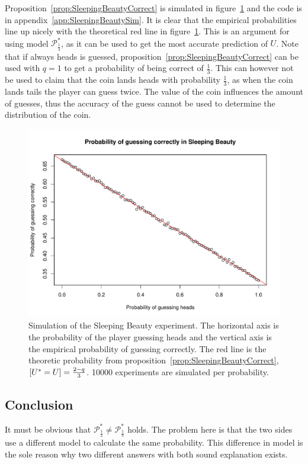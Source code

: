 \documentclass[twoside,a4paper]{article}
\theoremstyle{plain}
\theoremstyle{definition}
\theoremstyle{remark}
\numberwithin{equation}{section}
\let\P\relax
\DeclareMathOperator{\P}{\mathbb{P}}
\DeclareMathOperator{\1}{\mathbbm{1}}
\newcommand{\Pmod}{\mathcal{P}^*}
\begin{document}
Proposition~\ref{prop:SleepingBeautyCorrect} is simulated in figure~\ref{fig:SleepingBeautySim} and the code is in appendix~\ref{app:SleepingBeautySim}. It is clear that the empirical probabilities line up nicely with the theoretical red line in figure~\ref{fig:SleepingBeautySim}. This is an argument for using model $\Pmod_{\frac{1}{3}}$, as it can be used to get the most accurate prediction of $U$. Note that if always heads is guessed, proposition~\ref{prop:SleepingBeautyCorrect} can be used with $q=1$ to get a probability of being correct of $\frac{1}{3}$. This can however not be used to claim that the coin lands heads with probability $\frac{1}{3}$, as when the coin lands tails the player can guess twice. The value of the coin influences the amount of guesses, thus the accuracy of the guess cannot be used to determine the distribution of the coin.

\begin{figure}
\includegraphics[width=\linewidth]{Figures/SleepingBeauty.pdf}
\caption{Simulation of the Sleeping Beauty experiment. The horizontal axis is the probability of the player guessing heads and the vertical axis is the empirical probability of guessing correctly. The red line is the theoretic probability from proposition~\ref{prop:SleepingBeautyCorrect}, $\P[U^*=U]=\frac{2-q}{3}$. 10000 experiments are simulated per probability.}
\label{fig:SleepingBeautySim}
\end{figure}

\subsection{Conclusion}
It must be obvious that $\Pmod_{\frac{1}{2}}\neq\Pmod_{\frac{1}{3}}$ holds. The problem here is that the two sides use a different model to calculate the same probability. This difference in model is the sole reason why two different answers with both sound explanation exists. 
\end{document}
